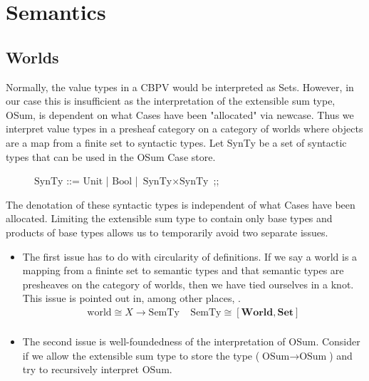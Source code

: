 \documentclass{article}
\newcommand{\world}{{\mathbf{World}}}
\begin{document}
\section{Semantics}
\subsection{Worlds}
Normally, the value types in a CBPV would be interpreted as Sets. However, in our case this is insufficient as 
the interpretation of the extensible sum type, OSum, is dependent on what Cases have been "allocated" via 
newcase. Thus we interpret value types in a presheaf category on a category of worlds where objects are a map 
from a finite set to syntactic types. Let SynTy be a set of syntactic types that can be used in the OSum Case store.

\begin{figure}[!ht]
\centering    
\begin{bnf}
$\textrm{SynTy}$ ::= $\textrm{Unit}$
| $\textrm{Bool}$
| $\textrm{SynTy} \times \textrm{SynTy}$
;;
\end{bnf}
\end{figure}

The denotation of these syntactic types is independent of what Cases have been allocated.
Limiting the extensible sum type to contain only base types and products of base types allows 
us to temporarily avoid two separate issues. 
\begin{itemize}
    \item The first issue has to do with circularity of definitions. If we say a world is a 
    mapping from a fininte set to semantic types and that semantic types are presheaves on 
    the category of worlds, then we have tied ourselves in a knot. This issue is pointed 
    out in, among other places, \cite{sterling_denotational_2023}.
    \begin{align*}
        \textrm{world} \cong X \rightarrow \textrm{SemTy} \;\;\;\; \textrm{SemTy} \cong [\world , \mathbf{Set}]\\
    \end{align*}
    
    \item The second issue is well-foundedness of the interpretation of OSum. Consider if we allow the extensible 
    sum type to store the type ($\textrm{OSum} \rightarrow \textrm{OSum}$) and try to recursively interpret $\textrm{OSum}$.

\end{itemize}
\end{document}
